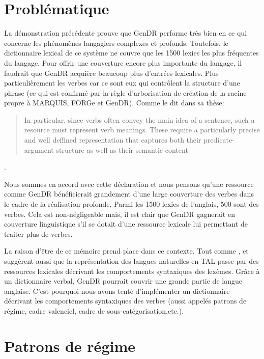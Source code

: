 \section{Problématique}\label{problema}

La démonstration précédente prouve que GenDR performe très bien en ce qui concerne les phénomènes langagiers complexes et profonds. Toutefois, le dictionnaire lexical de ce système ne couvre que les 1500 lexies les plus fréquentes du langage. Pour offrir une couverture encore plus importante du langage, il faudrait que GenDR acquière beaucoup plus d'entrées lexicales. Plus particulièrement les verbes car ce sont eux qui contrôlent la structure d'une phrase (ce qui est confirmé par la règle d'arborisation de création de la racine propre à MARQUIS, FORGe et GenDR). Comme \cite{SchulerVerbnetBroadcoverageComprehensive2005} le dit dans sa thèse:
\begin{quotation} In particular, since verbs often convey the main idea of a sentence, such a resource must represent verb meanings. These require a particularly precise and well deffined representation that captures both their predicate-argument structure as well as their semantic content\end{quotation}.

Nous sommes en accord avec cette déclaration et nous pensons qu'une ressource comme GenDR bénéficierait grandement d'une large couverture des verbes dans le cadre de la réalisation profonde. Parmi les 1500 lexies de l'anglais, 500 sont des verbes. Cela est non-négligeable mais, il est clair que GenDR gagnerait en couverture linguistique s'il se dotait d'une ressource lexicale lui permettant de traiter plus de verbes.

La raison d'être de ce mémoire prend place dans ce contexte. Tout comme \cite{SchulerVerbnetBroadcoverageComprehensive2005}, \cite{Korhonenlargesubcategorizationlexicon2006} et \cite{MESSIANT08.142} suggèrent aussi que la représentation des langues naturelles en \ac{TAL} passe par des ressources lexicales décrivant les comportements syntaxiques des lexèmes. Grâce à un dictionnaire verbal, GenDR pourrait couvrir une grande partie de langue anglaise. C'est pourquoi nous avons tenté d'implémenter un dictionnaire décrivant les comportements syntaxiques des verbes (aussi appelés patrons de régime, cadre valenciel, cadre de sous-catégorisation,etc.).

\section{Patrons de régime}\label{sectiongp}

